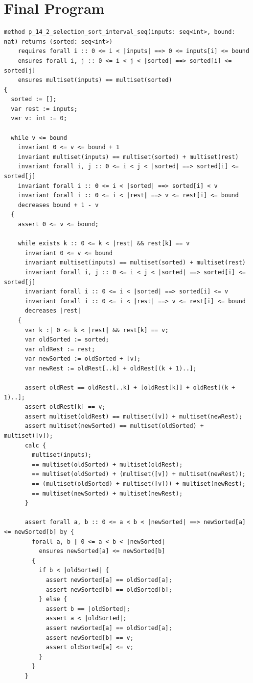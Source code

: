 \documentclass{article}
\begin{document}
\section*{Final Program}
\begin{lstlisting}
method p_14_2_selection_sort_interval_seq(inputs: seq<int>, bound: nat) returns (sorted: seq<int>)
	requires forall i :: 0 <= i < |inputs| ==> 0 <= inputs[i] <= bound
	ensures forall i, j :: 0 <= i < j < |sorted| ==> sorted[i] <= sorted[j]
	ensures multiset(inputs) == multiset(sorted)
{
  sorted := [];
  var rest := inputs;
  var v: int := 0;

  while v <= bound
    invariant 0 <= v <= bound + 1
    invariant multiset(inputs) == multiset(sorted) + multiset(rest)
    invariant forall i, j :: 0 <= i < j < |sorted| ==> sorted[i] <= sorted[j]
    invariant forall i :: 0 <= i < |sorted| ==> sorted[i] < v
    invariant forall i :: 0 <= i < |rest| ==> v <= rest[i] <= bound
    decreases bound + 1 - v
  {
    assert 0 <= v <= bound;

    while exists k :: 0 <= k < |rest| && rest[k] == v
      invariant 0 <= v <= bound
      invariant multiset(inputs) == multiset(sorted) + multiset(rest)
      invariant forall i, j :: 0 <= i < j < |sorted| ==> sorted[i] <= sorted[j]
      invariant forall i :: 0 <= i < |sorted| ==> sorted[i] <= v
      invariant forall i :: 0 <= i < |rest| ==> v <= rest[i] <= bound
      decreases |rest|
    {
      var k :| 0 <= k < |rest| && rest[k] == v;
      var oldSorted := sorted;
      var oldRest := rest;
      var newSorted := oldSorted + [v];
      var newRest := oldRest[..k] + oldRest[(k + 1)..];

      assert oldRest == oldRest[..k] + [oldRest[k]] + oldRest[(k + 1)..];
      assert oldRest[k] == v;
      assert multiset(oldRest) == multiset([v]) + multiset(newRest);
      assert multiset(newSorted) == multiset(oldSorted) + multiset([v]);
      calc {
        multiset(inputs);
        == multiset(oldSorted) + multiset(oldRest);
        == multiset(oldSorted) + (multiset([v]) + multiset(newRest));
        == (multiset(oldSorted) + multiset([v])) + multiset(newRest);
        == multiset(newSorted) + multiset(newRest);
      }

      assert forall a, b :: 0 <= a < b < |newSorted| ==> newSorted[a] <= newSorted[b] by {
        forall a, b | 0 <= a < b < |newSorted|
          ensures newSorted[a] <= newSorted[b]
        {
          if b < |oldSorted| {
            assert newSorted[a] == oldSorted[a];
            assert newSorted[b] == oldSorted[b];
          } else {
            assert b == |oldSorted|;
            assert a < |oldSorted|;
            assert newSorted[a] == oldSorted[a];
            assert newSorted[b] == v;
            assert oldSorted[a] <= v;
          }
        }
      }


\end{lstlisting}
\end{document}
